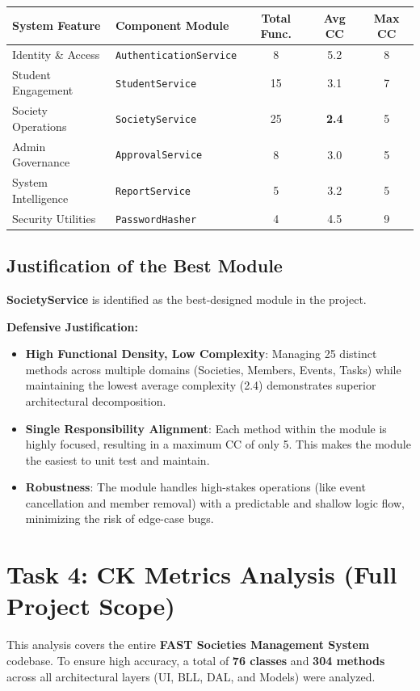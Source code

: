 \documentclass[12pt,a4paper]{article}
\begin{document}
\begin{table}[H]
\centering
\begin{tabularx}{\textwidth}{llccc}
\toprule
\textbf{System Feature} & \textbf{Component Module} & \textbf{Total Func.} & \textbf{Avg CC} & \textbf{Max CC} \\
\midrule
Identity \& Access & \texttt{AuthenticationService} & 8 & 5.2 & 8 \\
Student Engagement & \texttt{StudentService} & 15 & 3.1 & 7 \\
Society Operations & \texttt{SocietyService} & 25 & \textbf{2.4} & 5 \\
Admin Governance & \texttt{ApprovalService} & 8 & 3.0 & 5 \\
System Intelligence & \texttt{ReportService} & 5 & 3.2 & 5 \\
Security Utilities & \texttt{PasswordHasher} & 4 & 4.5 & 9 \\
\bottomrule
\end{tabularx}
\end{table}

\subsection{Justification of the Best Module}
\textbf{SocietyService} is identified as the best-designed module in the project.

\textbf{Defensive Justification:}
\begin{itemize}
    \item \textbf{High Functional Density, Low Complexity}: Managing 25 distinct methods across multiple domains (Societies, Members, Events, Tasks) while maintaining the lowest average complexity (2.4) demonstrates superior architectural decomposition.
    \item \textbf{Single Responsibility Alignment}: Each method within the module is highly focused, resulting in a maximum CC of only 5. This makes the module the easiest to unit test and maintain.
    \item \textbf{Robustness}: The module handles high-stakes operations (like event cancellation and member removal) with a predictable and shallow logic flow, minimizing the risk of edge-case bugs.
\end{itemize}

\newpage
\section{Task 4: CK Metrics Analysis (Full Project Scope)}
This analysis covers the entire \textbf{FAST Societies Management System} codebase. To ensure high accuracy, a total of \textbf{76 classes} and \textbf{304 methods} across all architectural layers (UI, BLL, DAL, and Models) were analyzed. 
\end{document}

